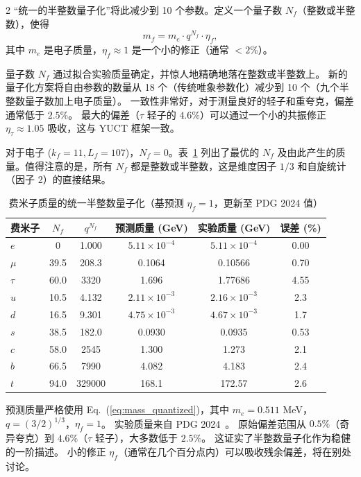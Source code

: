 \documentclass[11pt,a4paper]{article}
\begin{document}
\begin{multicols}{2}
		“统一的半整数量子化”将此减少到 10 个参数。定义一个量子数 \(N_f\)（整数或半整数），使得
		\begin{equation}
			m_f = m_e \cdot q^{N_f} \cdot \eta_f,
			\label{eq:mass_quantized}
		\end{equation}
		其中 \(m_e\) 是电子质量，\(\eta_f \approx 1\) 是一个小的修正（通常 \(<2\%\)）。
		
		量子数 \(N_f\) 通过拟合实验质量确定，并惊人地精确地落在整数或半整数上。
		新的量子化方案将自由参数的数量从 18 个（传统唯象参数化）减少到 10 个（九个半整数量子数加上电子质量）。
		一致性非常好，对于测量良好的轻子和重夸克，偏差通常低于 \(2.5\%\)。
		最大的偏差（\(\tau\) 轻子的 \(4.6\%\)）可以通过一个小的共振修正 \(\eta_\tau \approx 1.05\) 吸收，这与 YUCT 框架一致。
		
		对于电子 (\(k_f=11, L_f=107\))，\(N_f=0\)。表~\ref{tab:fermions_new} 列出了最优的 \(N_f\) 及由此产生的质量。值得注意的是，所有 \(N_f\) 都是整数或半整数，这是维度因子 \(1/3\) 和自旋统计（因子 2）的直接结果。
		
		\begin{table}[H]
			\centering
			\caption{费米子质量的统一半整数量子化（基预测 \(\eta_f=1\)，更新至 PDG 2024 值）}
			\label{tab:fermions_new}
			\tiny  
			\begin{tabular}{l c c c c c}
				\toprule
				费米子 & \(N_f\) & \(q^{N_f}\) & 预测质量 (GeV) & 实验质量 (GeV) & 误差 (\%) \\
				\midrule
				\(e\)   & 0      & 1.000 & \(5.11\times10^{-4}\) & \(5.11\times10^{-4}\) & 0.00 \\
				\(\mu\)  & 39.5   & 208.3 & 0.1064                & 0.10566              & 0.70 \\
				\(\tau\) & 60.0   & 3320  & 1.696                 & 1.77686              & 4.55 \\
				\(u\)   & 10.5   & 4.132 & \(2.11\times10^{-3}\)   & \(2.16\times10^{-3}\)  & 2.3 \\
				\(d\)   & 16.5   & 9.301 & \(4.75\times10^{-3}\)   & \(4.67\times10^{-3}\)  & 1.7 \\
				\(s\)   & 38.5   & 182.0 & 0.0930                & 0.0935               & 0.53 \\
				\(c\)   & 58.0   & 2545  & 1.300                 & 1.273                & 2.1 \\
				\(b\)   & 66.5   & 7990  & 4.082                 & 4.183                & 2.4 \\
				\(t\)   & 94.0   & 329000& 168.1                 & 172.57               & 2.6 \\
				\bottomrule
			\end{tabular}
			\par\smallskip
			\footnotesize 
			预测质量严格使用 Eq.~(\ref{eq:mass_quantized})，其中 \(m_e = 0.511\) MeV，\(q = (3/2)^{1/3}\)，\(\eta_f = 1\)。 
			实验质量来自 PDG 2024~\cite{PDG2024}。 
			原始偏差范围从 \(0.5\%\)（奇异夸克）到 \(4.6\%\)（\(\tau\) 轻子），大多数低于 \(2.5\%\)。 
			这证实了半整数量子化作为稳健的一阶描述。 
			小的修正 \(\eta_f\)（通常在几个百分点内）可以吸收残余偏差，将在别处讨论。
		\end{table}
		

\end{multicols}
\end{document}
